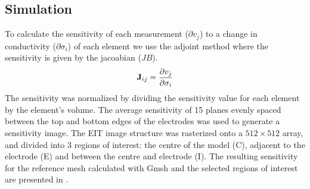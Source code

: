 \subsection{Simulation}

To calculate the sensitivity of each measurement ($\partial v_j$) to a change in conductivity 
($\partial \sigma_i$)
of each element
we use the adjoint method \parencite{polydorides_electrode_2002} where the sensitivity is given by
the jacoabian ($JB$).
\begin{equation}
  {\mbox{\bf J}}_{ij}=\frac{\partial v_j}{\partial \sigma_i}
\end{equation}
The sensitivity was normalized by dividing the sensitivity value for each element 
by the element's volume. 
The average sensitivity of 15 planes evenly spaced between the top and bottom edges of the electrodes
was used to generate a sensitivity image.
The EIT image structure was rasterized onto a $512\times512$ array, and divided into 3 regions of interest:
the centre of the model (C), adjacent to the electrode (E) and between the centre and electrode
(I). The resulting sensitivity for the reference mesh calculated with Gmsh and the 
selected regions of interest are presented in .


